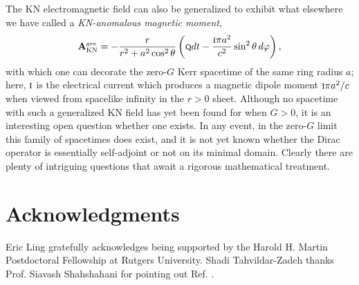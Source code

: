 \documentclass[11 pt]{article}
\renewcommand\({\left(}
\renewcommand\){\right)}
\newcommand\<{\langle}
\renewcommand\>{\rangle}
\newcommand\8{\infty}
\newcommand\beq{\begin{equation}}
\newcommand\eeq{\end{equation}}
\newcommand{\bAKNanom}{\mathbf{A}_{\textsc{KN}}^{\mbox{\tiny\textrm{gen}}}}
\begin{document}
The KN electromagnetic field can also be generalized to exhibit what elsewhere we have called a \emph{KN-anomalous magnetic moment},
\beq\label{def:AKNanomalous}
\bAKNanom = - \frac{r}{r^2+a^2\cos^2\theta} \left(\textsc{q}dt - \frac{\textsc{i}\pi a^2}{c^2} \sin^2\theta\, d\varphi\right),
\eeq
with which one can decorate the zero-$G$ Kerr spacetime of the same ring radius $a$; here,
$\textsc{i}$ is the electrical current which produces a magnetic dipole moment $\textsc{i}\pi a^2/c$ when viewed from
spacelike infinity in the $r>0$ sheet.
 Although no spacetime with such a generalized KN field has yet been found for when $G>0$, it is an interesting open question
whether one exists. 
 In any event, in the zero-$G$ limit this family of spacetimes does exist, and it is not yet known whether the Dirac operator is
essentially self-adjoint or not on its minimal domain. 
 Clearly there are plenty of intriguing questions that await a rigorous mathematical treatment.
 
\medskip

\section*{Acknowledgments} 
Eric Ling gratefully acknowledges being supported by the Harold H. Martin Postdoctoral Fellowship at Rutgers University. Shadi Tahvildar-Zadeh thanks Prof. Siavash Shahshahani for pointing out Ref. \cite{QTPDS}.
 
 
 \newpage
 \appendix
 
\end{document}
